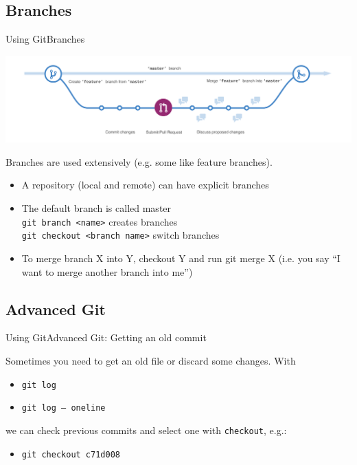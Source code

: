 \documentclass[10pt,compress]{beamer} %
\begin{document}
\subsection{Branches}
\begin{frame}{Using Git}{Branches}

\centering \includegraphics[width=.8\textwidth]{figs/branching}

Branches are used extensively (e.g. some like feature branches).

\begin{itemize}
 \item A repository (local and remote) can have explicit branches
 \item The default branch is called \alert{master}\\
 		\texttt{git branch <name>} creates branches\\
  		\texttt{git checkout <branch name>} switch branches\\
 \item To merge branch X into Y, checkout Y and run git merge X
(i.e. you say “I want to merge another branch into me”)
\end{itemize}

\end{frame}


\subsection{Advanced Git}
\begin{frame}{Using Git}{Advanced Git: Getting an old commit}

Sometimes you need to get an old file or discard some changes. With

\begin{itemize}
 \item \texttt{git log}
 \item \texttt{git log -- oneline}
\end{itemize}

we can check previous commits and select one with \texttt{checkout}, e.g.:
\begin{itemize}
 \item \texttt{git checkout c71d008}
\end{itemize}

\end{frame}
\end{document}
